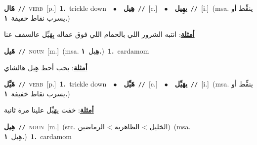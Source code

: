 \documentclass[10pt,a4paper,twoside]{article} %
\begin{document}
\begin{multicols}{2}
{\setlength\topsep{0pt}\textbf{\foreignlanguage{arabic}{هَال}}\ {\color{gray}\texttt{//}\color{black}}\ \textsc{verb}\ [p.]\ \textbf{1.}~trickle down\ \ $\bullet$\ \ \setlength\topsep{0pt}\textbf{\foreignlanguage{arabic}{هِيل}}\ {\color{gray}\texttt{//}\color{black}}\ [c.]\ \ $\bullet$\ \ \setlength\topsep{0pt}\textbf{\foreignlanguage{arabic}{يهِيل}}\ {\color{gray}\texttt{//}\color{black}}\ [i.]\ \color{gray}(msa. \foreignlanguage{arabic}{ينقِّط أو يسرب نقاط خفيفة}~\foreignlanguage{arabic}{\textbf{١.}})\color{black}\  \begin{flushright}\color{gray}\foreignlanguage{arabic}{\textbf{\underline{\foreignlanguage{arabic}{أمثلة}}}: انتبه الشرور اللي بالحمام اللي فوق عماله بِهَيِّل عالسقف عنا}\end{flushright}\color{black}} \vspace{2mm}

{\setlength\topsep{0pt}\textbf{\foreignlanguage{arabic}{هَيل}}\ {\color{gray}\texttt{//}\color{black}}\ \textsc{noun}\ [m.]\ \color{gray}(msa. \foreignlanguage{arabic}{هِيل}~\foreignlanguage{arabic}{\textbf{١.}})\color{black}\ \textbf{1.}~cardamom\  \begin{flushright}\color{gray}\foreignlanguage{arabic}{\textbf{\underline{\foreignlanguage{arabic}{أمثلة}}}: بحب أحط هِيل هالشاي}\end{flushright}\color{black}} \vspace{2mm}

{\setlength\topsep{0pt}\textbf{\foreignlanguage{arabic}{هَيَّل}}\ {\color{gray}\texttt{//}\color{black}}\ \textsc{verb}\ [p.]\ \textbf{1.}~trickle down\ \ $\bullet$\ \ \setlength\topsep{0pt}\textbf{\foreignlanguage{arabic}{هَيِّل}}\ {\color{gray}\texttt{//}\color{black}}\ [c.]\ \ $\bullet$\ \ \setlength\topsep{0pt}\textbf{\foreignlanguage{arabic}{يهَيِّل}}\ {\color{gray}\texttt{//}\color{black}}\ [i.]\ \color{gray}(msa. \foreignlanguage{arabic}{ينقِّط أو يسرب نقاط خفيفة}~\foreignlanguage{arabic}{\textbf{١.}})\color{black}\  \begin{flushright}\color{gray}\foreignlanguage{arabic}{\textbf{\underline{\foreignlanguage{arabic}{أمثلة}}}: خفت يهَيِّل علينا مرة ثانية}\end{flushright}\color{black}} \vspace{2mm}

{\setlength\topsep{0pt}\textbf{\foreignlanguage{arabic}{هِيل}}\ {\color{gray}\texttt{//}\color{black}}\ \textsc{noun}\ [m.]\ (src. \color{gray}\foreignlanguage{arabic}{الخليل > الظاهرية > الرماضين}\color{black})\ \color{gray}(msa. \foreignlanguage{arabic}{هِيل}~\foreignlanguage{arabic}{\textbf{١.}})\color{black}\ \textbf{1.}~cardamom\ } \vspace{2mm}


\end{multicols}
\end{document}
